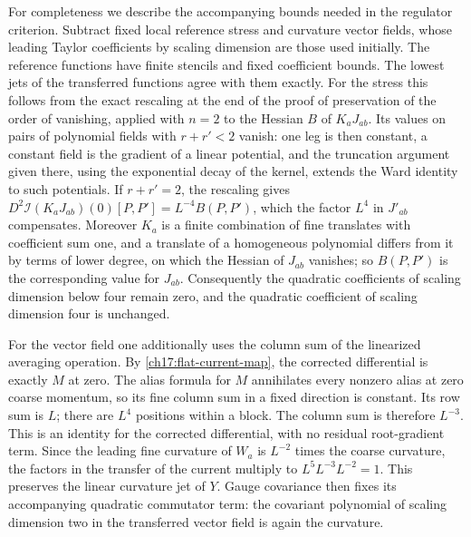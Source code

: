 For completeness we describe the accompanying bounds needed in the
regulator criterion. Subtract fixed local reference stress and curvature
vector fields, whose leading Taylor coefficients by scaling dimension are those used initially.
The reference functions have finite stencils and fixed coefficient bounds.
The lowest jets of the transferred functions agree with them exactly.
For the stress this follows from the exact rescaling at the end of the proof of preservation of the order of vanishing,
applied with $n=2$ to the Hessian $B$ of $K_aJ_{ab}$. Its values on pairs of polynomial fields with $r+r'<2$ vanish: one leg is then constant,
a constant field is the gradient of a linear potential, and the truncation argument given there, using the exponential decay of the kernel, extends the Ward identity to such potentials. If
$r+r'=2$, the rescaling gives $D^2\mathcal I(K_aJ_{ab})(0)[P,P']=L^{-4}B(P,P')$, which the factor $L^4$ in $J'_{ab}$ compensates.
Moreover $K_a$ is a finite combination of fine translates with coefficient sum one, and a translate of a homogeneous polynomial
differs from it by terms of lower degree, on which the Hessian of $J_{ab}$ vanishes; so $B(P,P')$ is the corresponding value for $J_{ab}$.
Consequently the quadratic coefficients of scaling dimension below four remain zero, and the quadratic
coefficient of scaling dimension four is unchanged.

For the vector field one additionally uses the column sum of the linearized averaging operation.
By \eqref{ch17:flat-current-map}, the corrected differential is exactly
$M$ at zero. The alias formula
for $M$ annihilates every nonzero alias at zero coarse momentum, so its
fine column sum in a fixed direction is constant. Its row sum is $L$;
there are $L^4$ positions within a block. The column sum is therefore $L^{-3}$.
This is an identity for the corrected differential, with no residual
root-gradient term. Since the leading fine curvature of $W_a$ is $L^{-2}$ times
the coarse curvature, the factors in the transfer of the current multiply to
$L^5L^{-3}L^{-2}=1$. This preserves the linear curvature jet of $Y$.
Gauge covariance then fixes its accompanying quadratic commutator term:
the covariant polynomial of scaling dimension two in the transferred
vector field is again the curvature.

